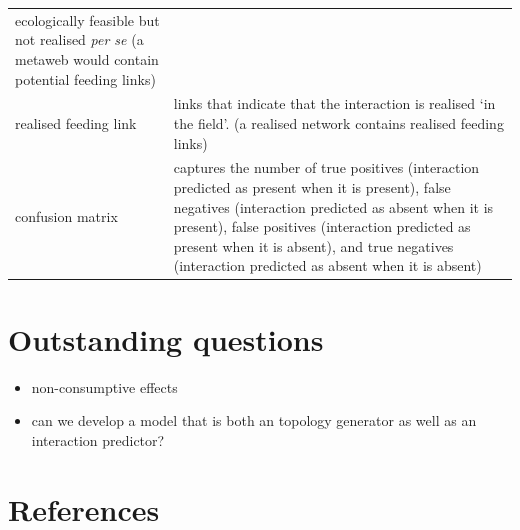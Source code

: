 \documentclass[
]{article}
\begin{document}
\begin{longtable}[]{@{}
  >{\raggedright\arraybackslash}p{}
  >{\raggedright\arraybackslash}p{}@{}}
ecologically feasible but not realised \emph{per se} (a metaweb would
contain potential feeding links) \\
realised feeding link & links that indicate that the interaction is
realised `in the field'. (a realised network contains realised feeding
links) \\
confusion matrix & captures the number of true positives (interaction
predicted as present when it is present), false negatives (interaction
predicted as absent when it is present), false positives (interaction
predicted as present when it is absent), and true negatives (interaction
predicted as absent when it is absent) \\
\end{longtable}

\section*{Outstanding questions}\label{outstanding-questions}

\begin{itemize}
\item
  non-consumptive effects
\item
  can we develop a model that is both an topology generator as well as
  an interaction predictor?
\end{itemize}

\section*{References}\label{references}
\end{document}
